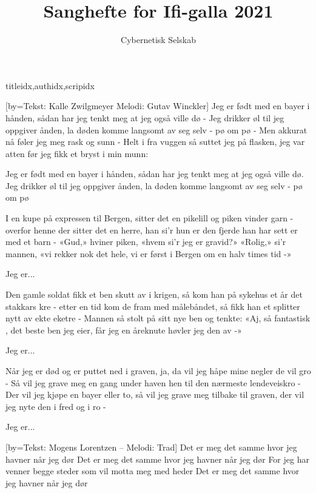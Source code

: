 \documentclass[14pt,letterpaper,norsk]{article}
\title{Sanghefte for Ifi-galla 2021}
\author{Cybernetisk Selskab}
\date{}
\begin{document}

\newpage

\begin{songs}{titleidx,authidx,scripidx}

[by={Tekst: Kalle Zwilgmeyer \newline Melodi: Gutav Winckler}]
\beginverse
Jeg er født med en bayer i hånden,
sådan har jeg tenkt meg at jeg også ville dø -
Jeg drikker øl til jeg oppgiver ånden,
la døden komme langsomt av seg selv - pø om pø -
Men akkurat nå føler jeg meg rask og sunn -
Helt i fra vuggen så suttet jeg på flasken,
jeg var atten før jeg fikk et bryst i min munn:
\endverse

\beginchorus
Jeg er født med en bayer i hånden,
sådan har jeg tenkt meg at jeg også ville dø.
Jeg drikker øl til jeg oppgiver ånden,
la døden komme langsomt av seg selv - pø om pø
\endchorus

\beginverse
I en kupe på expressen til Bergen,
sitter det en pikelill og piken vinder garn -
overfor henne der sitter det en herre,
han si'r hun er den fjerde han har sett er med et barn -
«Gud,» hviner piken, «hvem si'r jeg er gravid?»
«Rolig,» si'r mannen, «vi rekker nok det hele,
vi er først i Bergen om en halv times tid -»
\endverse

\beginchorus
Jeg er...
\endchorus

\beginverse
Den gamle soldat fikk et ben skutt av i krigen,
så kom han på sykehus et år det stakkars kre -
etter en tid kom de fram med målebåndet,
så fikk han et splitter nytt av ekte eketre -
Mannen så stolt på sitt nye ben og tenkte:
«Aj, så fantastisk , det beste ben jeg eier,
får jeg en åreknute høvler jeg den av -»
\endverse

\beginchorus
Jeg er...
\endchorus

\beginverse
Når jeg er død og er puttet ned i graven,
ja, da vil jeg håpe mine negler de vil gro -
Så vil jeg grave meg en gang under haven
hen til den nærmeste lendeveiskro -
Der vil jeg kjøpe en bayer eller to,
så vil jeg grave meg tilbake til graven,
der vil jeg nyte den i fred og i ro -
\endverse

\beginchorus
Jeg er...
\endchorus
\endsong

[by={Tekst: Mogens Lorentzen -- Melodi: Trad}]
\beginverse
Det er meg det samme hvor jeg havner når jeg dør
Det er meg det samme hvor jeg havner når jeg dør
For jeg har venner begge steder som vil motta meg med heder
Det er meg det samme hvor jeg havner når jeg dør
\endverse


\end{songs}
\end{document}
